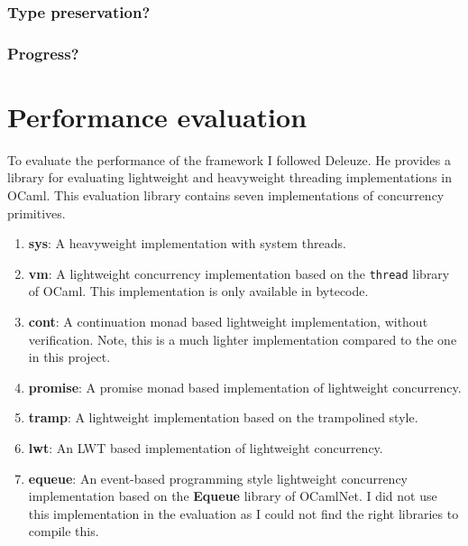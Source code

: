 \documentclass[12pt,twoside,notitlepage]{report}
\begin{document}
\subsubsection{Type preservation?}
\subsubsection{Progress?} 

\section{Performance evaluation}
To evaluate the performance of the framework I followed Deleuze\cite{deleuzelight}. He provides a library for evaluating lightweight and heavyweight threading implementations in OCaml. This evaluation library contains seven implementations of concurrency primitives.
\begin{enumerate}
\item{\textbf{sys}: A heavyweight implementation with system threads.}
\item{\textbf{vm}: A lightweight concurrency implementation based on the \verb|thread| library of OCaml. This implementation is only available in bytecode.}
\item{\textbf{cont}: A continuation monad based lightweight implementation, without verification. Note, this is a much lighter implementation compared to the one in this project.}
\item{\textbf{promise}: A promise monad based implementation of lightweight concurrency.}
\item{\textbf{tramp}: A lightweight implementation based on the trampolined style.}
\item{\textbf{lwt}: An LWT\cite{LWT} based implementation of lightweight concurrency.}
\item{\textbf{equeue}: An event-based programming style lightweight concurrency implementation based on the \textbf{Equeue} library of OCamlNet. I did not use this implementation in the evaluation as I could not find the right libraries to compile this.}
\end{enumerate}
\end{document}
